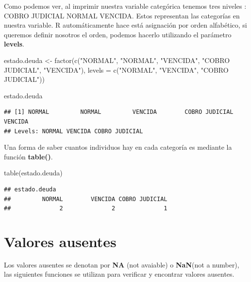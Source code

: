 \documentclass[
  12pt,
]{book}
\newenvironment{Shaded}{\begin{snugshade}}{\end{snugshade}}
\newcommand{\AttributeTok}[1]{\textcolor[rgb]{0.77,0.63,0.00}{#1}}
\newcommand{\FunctionTok}[1]{\textcolor[rgb]{0.00,0.00,0.00}{#1}}
\newcommand{\NormalTok}[1]{#1}
\newcommand{\OtherTok}[1]{\textcolor[rgb]{0.56,0.35,0.01}{#1}}
\newcommand{\StringTok}[1]{\textcolor[rgb]{0.31,0.60,0.02}{#1}}
\begin{document}
Como podemos ver, al imprimir nuestra variable categórica tenemos tres niveles : COBRO JUDICIAL NORMAL VENCIDA. Estos representan las categorías en nuestra variable. R automáticamente hace está asignación por orden alfabético, si queremos definir nosotros el orden, podemos hacerlo utilizando el parámetro \textbf{levels}.

\begin{Shaded}
\begin{Highlighting}[]
\NormalTok{estado.deuda }\OtherTok{\textless{}{-}} \FunctionTok{factor}\NormalTok{(}\FunctionTok{c}\NormalTok{(}\StringTok{"NORMAL"}\NormalTok{, }\StringTok{"NORMAL"}\NormalTok{, }\StringTok{"VENCIDA"}\NormalTok{, }\StringTok{"COBRO JUDICIAL"}\NormalTok{, }\StringTok{"VENCIDA"}\NormalTok{), }\AttributeTok{levels =} \FunctionTok{c}\NormalTok{(}\StringTok{"NORMAL"}\NormalTok{, }\StringTok{"VENCIDA"}\NormalTok{, }\StringTok{"COBRO JUDICIAL"}\NormalTok{))}

\NormalTok{estado.deuda}
\end{Highlighting}
\end{Shaded}

\begin{verbatim}
## [1] NORMAL         NORMAL         VENCIDA        COBRO JUDICIAL VENCIDA       
## Levels: NORMAL VENCIDA COBRO JUDICIAL
\end{verbatim}

Una forma de saber cuantos individuos hay en cada categoría es mediante la función \textbf{table()}.

\begin{Shaded}
\begin{Highlighting}[]
\FunctionTok{table}\NormalTok{(estado.deuda)}
\end{Highlighting}
\end{Shaded}

\begin{verbatim}
## estado.deuda
##         NORMAL        VENCIDA COBRO JUDICIAL 
##              2              2              1
\end{verbatim}

\hypertarget{valores-ausentes}{%
\section{\texorpdfstring{\textbf{Valores ausentes}}{Valores ausentes}}\label{valores-ausentes}}

Los valores ausentes se denotan por \textbf{NA} (not avaiable) o \textbf{NaN}(not a number), las siguientes funciones se utilizan para verificar y encontrar valores ausentes.
\end{document}
